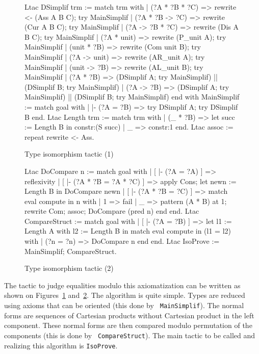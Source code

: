 \begin{coq_example}
\begin{figure}[ht]
\begin{centerframe}
\begin{coq_example}
Ltac DSimplif trm :=
  match trm with
  | (?A * ?B * ?C) =>
      rewrite <- (Ass A B C); try MainSimplif
  | (?A * ?B -> ?C) =>
      rewrite (Cur A B C); try MainSimplif
  | (?A -> ?B * ?C) =>
      rewrite (Dis A B C); try MainSimplif
  | (?A * unit) =>
      rewrite (P_unit A); try MainSimplif
  | (unit * ?B) =>
      rewrite (Com unit B); try MainSimplif
  | (?A -> unit) =>
      rewrite (AR_unit A); try MainSimplif
  | (unit -> ?B) =>
      rewrite (AL_unit B); try MainSimplif
  | (?A * ?B) =>
      (DSimplif A; try MainSimplif) || (DSimplif B; try MainSimplif)
  | (?A -> ?B) =>
      (DSimplif A; try MainSimplif) || (DSimplif B; try MainSimplif)
  end
 with MainSimplif :=
  match goal with
  | |- (?A = ?B) => try DSimplif A; try DSimplif B
  end.
Ltac Length trm :=
  match trm with
  | (_ * ?B) => let succ := Length B in constr:(S succ)
  | _ => constr:1
  end.
Ltac assoc := repeat rewrite <- Ass.
\end{coq_example}
\end{centerframe}
\caption{Type isomorphism tactic (1)}
\label{isosltac1}
\end{figure}

\begin{figure}[ht]
\begin{centerframe}
\begin{coq_example}
Ltac DoCompare n :=
  match goal with
  | [ |- (?A = ?A) ] => reflexivity
  | [ |- (?A * ?B = ?A * ?C) ] =>
      apply Cons; let newn := Length B in
                  DoCompare newn
  | [ |- (?A * ?B = ?C) ] =>
      match eval compute in n with
      | 1 => fail
      | _ =>
          pattern (A * B) at 1; rewrite Com; assoc; DoCompare (pred n)
      end
  end.
Ltac CompareStruct :=
  match goal with
  | [ |- (?A = ?B) ] =>
      let l1 := Length A
      with l2 := Length B in
      match eval compute in (l1 = l2) with
      | (?n = ?n) => DoCompare n
      end
  end.
Ltac IsoProve := MainSimplif; CompareStruct.
\end{coq_example}
\end{centerframe}
\caption{Type isomorphism tactic (2)}
\label{isosltac2}
\end{figure}

The tactic to judge equalities modulo this axiomatization can be written as
shown on Figures~\ref{isosltac1} and~\ref{isosltac2}. The algorithm is quite
simple. Types are reduced using axioms that can be oriented (this done by {\tt
MainSimplif}). The normal forms are sequences of Cartesian
products without Cartesian product in the left component. These normal forms
are then compared modulo permutation of the components (this is done by {\tt
CompareStruct}). The main tactic to be called and realizing this algorithm is
{\tt IsoProve}.


\end{coq_example}
